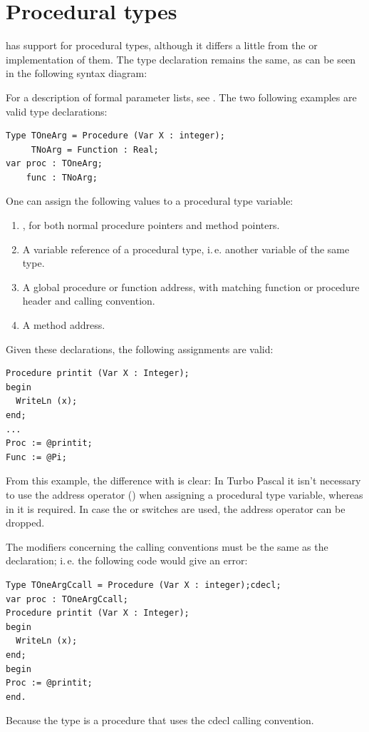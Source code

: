\section{Procedural types}\label{se:proceduraltypes}
\fpc has support for procedural types, although it differs a little from
the \tp or \delphi implementation of them. The type declaration remains the
same, as can be seen in the following syntax diagram:

For a description of formal parameter lists, see .
The two following examples are valid type declarations:
\begin{verbatim}
Type TOneArg = Procedure (Var X : integer);
     TNoArg = Function : Real;
var proc : TOneArg;
    func : TNoArg;
\end{verbatim}
One can assign the following values to a procedural type variable:
\begin{enumerate}
\item {}, for both normal procedure pointers and method pointers.
\item A variable reference of a procedural type, i.\,e. another variable of
the same type.
\item A global procedure or function address, with matching function or
procedure header and calling convention.
\item A method address.
\end{enumerate}
Given these declarations, the following assignments are valid:
\begin{verbatim}
Procedure printit (Var X : Integer);
begin
  WriteLn (x);
end;
...
Proc := @printit;
Func := @Pi;
\end{verbatim}
From this example, the difference with \tp is clear: In Turbo
Pascal it isn't necessary to use the address operator ()
when assigning a procedural type variable, whereas in \fpc it is required.
In case the  or  switches are used, the address
operator can be dropped.
\begin{remark} The modifiers concerning the calling conventions
must be the same as the declaration;
i.\,e. the following code would give an error:
\begin{verbatim}
Type TOneArgCcall = Procedure (Var X : integer);cdecl;
var proc : TOneArgCcall;
Procedure printit (Var X : Integer);
begin
  WriteLn (x);
end;
begin
Proc := @printit;
end.
\end{verbatim}
Because the  type is a procedure that uses the cdecl
calling convention.
\end{remark}

